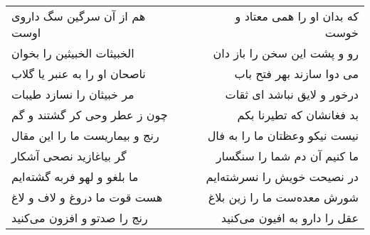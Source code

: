 \begin{center}
\begin{longtable}{l p{0.5cm} r}
هم از آن سرگین سگ داروی اوست
&&
که بدان او را همی معتاد و خوست
\\
الخبیثات الخبیثین را بخوان
&&
رو و پشت این سخن را باز دان
\\
ناصحان او را به عنبر یا گلاب
&&
می دوا سازند بهر فتح باب
\\
مر خبیثان را نسازد طیبات
&&
درخور و لایق نباشد ای ثقات
\\
چون ز عطر وحی کر گشتند و گم
&&
بد فغانشان که تطیرنا بکم
\\
رنج و بیماریست ما را این مقال
&&
نیست نیکو وعظتان ما را به فال
\\
گر بیاغازید نصحی آشکار
&&
ما کنیم آن دم شما را سنگسار
\\
ما بلغو و لهو فربه گشته‌ایم
&&
در نصیحت خویش را نسرشته‌ایم
\\
هست قوت ما دروغ و لاف و لاغ
&&
شورش معده‌ست ما را زین بلاغ
\\
رنج را صدتو و افزون می‌کنید
&&
عقل را دارو به افیون می‌کنید
\\
\end{longtable}
\end{center}
